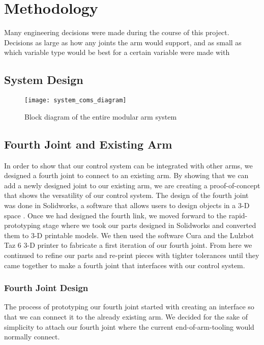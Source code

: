 \section{Methodology}
Many engineering decisions were made during the course of this project. Decisions as large as how any joints the arm would support, and as small as which variable type would be best for a certain variable were made with 

\subsection{System Design}
\begin{figure}[H]
	\centering
	\texttt{[image: system\_coms\_diagram]}
	\caption{Block diagram of the entire modular arm system}
	\label{fig:system_block_diagram}
\end{figure}

\subsection{Fourth Joint and Existing Arm}
In order to show that our control system can be integrated with other arms, we designed a fourth joint to connect to an existing arm. By showing that we can add a newly designed joint to our existing arm, we are creating a proof-of-concept that shows the versatility of our control system.  The design of the fourth joint was done in Solidworks, a software that allows users to design objects in a 3-D space \cite{Solidworks}. Once we had designed the fourth link, we moved forward to the rapid-prototyping stage where we took our parts designed in Solidworks and converted them to 3-D printable models.  We then used the software Cura \cite{Cura} and the Lulzbot Taz 6 3-D printer \cite{Taz6} to fabricate a first iteration of our fourth joint.  From here we continued to refine our parts and re-print pieces with tighter tolerances until they came together to make a fourth joint that interfaces with our control system.

\subsubsection{Fourth Joint Design}
The process of prototyping our fourth joint started with creating an interface so that we can connect it to the already existing arm.  We decided for the sake of simplicity to attach our fourth joint where the current end-of-arm-tooling would normally connect. \\

